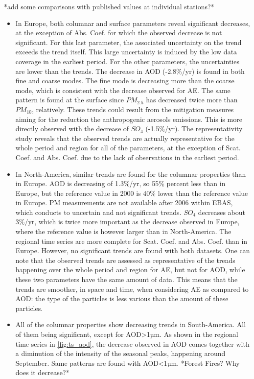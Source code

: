 \documentclass[journal abbreviation, manuscript]{copernicus}
\begin{document}
*add some comparisons with published values at individual stations?*
\begin{itemize}
 \item In Europe, both columnar and surface parameters reveal significant decreases, at the exception of Abs. Coef. for which the observed decrease is not significant. For this last parameter, the associated uncertainty on the trend exceeds the trend itself. This large uncertainty is induced by the low data coverage in the earliest period. For the other parameters, the uncertainties are lower than the trends. The decrease in AOD (-2.8\%/yr) is found in both fine and coarse modes. The fine mode is decreasing more than the coarse mode, which is consistent with the decrease observed for AE. The same pattern is found at the surface since $PM_{2.5}$ has decreased twice more than $PM_{10}$, relatively. These trends could result from the mitigation measures aiming for the reduction the anthropogenic aerosols emissions. This is more directly observed with the decrease of $SO_{4}$ (-1.5\%/yr). The representativity study reveals that the observed trends are actually representative for the whole period and region for all of the parameters, at the exception of Scat. Coef. and Abs. Coef. due to the lack of observations in the earliest period.
 \item In North-America, similar trends are found for the columnar properties than in Europe. AOD is decreasing of 1.3\%/yr, so 55\% percent less than in Europe, but the reference value in 2000 is 40\% lower than the reference value in Europe. PM measurements are not available after 2006 within EBAS, which conducts to uncertain and not significant trends. $SO_{4}$ decreases about 3\%/yr, which is twice more important as the decrease observed in Europe, where the reference value is however larger than in North-America. The regional time series are more complete for Scat. Coef. and Abs. Coef. than in Europe. However, no significant trends are found with both datasets. One can note that the observed trends are assessed as representative of the trends happening over the whole period and region for AE, but not for AOD, while these two parameters have the same amount of data. This means that the trends are smoother, in space and time, when considering AE as compared to AOD: the type of the particles is less various than the amount of these particles.
 \item All of the columnar properties show decreasing trends in South-America. All of them being significant, except for AOD>1µm. As shown in the regional time series in \ref{fig:ts_aod}, the decrease observed in AOD comes together with a diminution of the intensity of the seasonal peaks, happening around September. Same patterns are found with AOD<1µm. *Forest Fires? Why does it decrease?*

\end{itemize}
\end{document}
